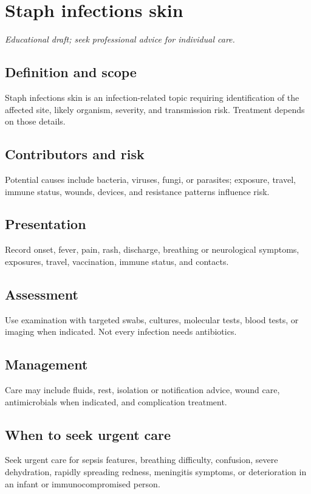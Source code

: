 \chapter{Staph infections skin}
\medskip
\noindent\textit{Educational draft; seek professional advice for individual care.}

\section*{Definition and scope}
Staph infections skin is an infection-related topic requiring identification of the affected site, likely organism, severity, and transmission risk. Treatment depends on those details.

\section*{Contributors and risk}
Potential causes include bacteria, viruses, fungi, or parasites; exposure, travel, immune status, wounds, devices, and resistance patterns influence risk.

\section*{Presentation}
Record onset, fever, pain, rash, discharge, breathing or neurological symptoms, exposures, travel, vaccination, immune status, and contacts.

\section*{Assessment}
Use examination with targeted swabs, cultures, molecular tests, blood tests, or imaging when indicated. Not every infection needs antibiotics.

\section*{Management}
Care may include fluids, rest, isolation or notification advice, wound care, antimicrobials when indicated, and complication treatment.

\section*{When to seek urgent care}
Seek urgent care for sepsis features, breathing difficulty, confusion, severe dehydration, rapidly spreading redness, meningitis symptoms, or deterioration in an infant or immunocompromised person.

